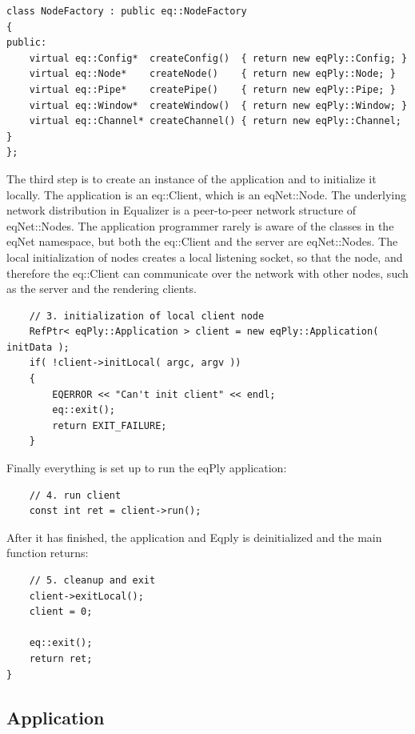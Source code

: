 \documentclass[10pt,a4]{scrartcl}
\begin{document}
{\small\begin{lstlisting}
class NodeFactory : public eq::NodeFactory
{
public:
    virtual eq::Config*  createConfig()  { return new eqPly::Config; }
    virtual eq::Node*    createNode()    { return new eqPly::Node; }
    virtual eq::Pipe*    createPipe()    { return new eqPly::Pipe; }
    virtual eq::Window*  createWindow()  { return new eqPly::Window; }
    virtual eq::Channel* createChannel() { return new eqPly::Channel; }
};
\end{lstlisting}}

The third step is to create an instance of the application and to
initialize it locally. The application is an \textsf{eq::Client}, which
is an \textsf{eqNet::Node}. The underlying network distribution in
Equalizer is a peer-to-peer network structure of
\textsf{eqNet::Node}s. The application programmer rarely is aware of the
classes in the \textsf{eqNet} namespace, but both the
\textsf{eq::Client} and the server are \textsf{eqNet::Node}s. The local
initialization of nodes creates a local listening socket, so that the
node, and therefore the \textsf{eq::Client} can communicate over the
network with other nodes, such as the server and the rendering clients.

{\small\begin{lstlisting}
    // 3. initialization of local client node
    RefPtr< eqPly::Application > client = new eqPly::Application( initData );
    if( !client->initLocal( argc, argv ))
    {
        EQERROR << "Can't init client" << endl;
        eq::exit();
        return EXIT_FAILURE;
    }
\end{lstlisting}}

Finally everything is set up to run the \textsf{eqPly} application:

{\small\begin{lstlisting}
    // 4. run client
    const int ret = client->run();
\end{lstlisting}}

After it has finished, the application and Eqply is deinitialized and
the \textsf{main} function returns:

{\small\begin{lstlisting}
    // 5. cleanup and exit
    client->exitLocal();
    client = 0;

    eq::exit();
    return ret;
}
\end{lstlisting}}

\subsection{Application}
\end{document}
